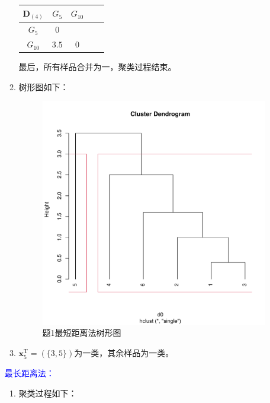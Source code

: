 \begin{enumerate}
\begin{enumerate}[label=(\arabic*)]
\begin{table}[H]
                \centering
                \begin{tabular}{|c|c|c|c|c|}
                    \hline
                    $\pmb{D}_{(4)}$ & $G_5$ & $G_{10}$ \\ \hline
                    $G_5$ & $0$ & \\ \hline
                    $G_{10}$ & $\textit{3.5}$ & $0$ \\ \hline
                \end{tabular}
            \end{table}
            最后，所有样品合并为一，聚类过程结束。
            \item 树形图如下：
            \begin{figure}[H]
                \centering
                \includegraphics[scale=0.5]{7.1最短距离法.pdf}
                \caption{题1最短距离法树形图}
            \end{figure}
            \item $\pmb{x}_5^{\mathrm{T}}=(\{3,5\})$为一类，其余样品为一类。
        \end{enumerate}
        {\kaishu \textcolor{blue}{最长距离法：}}
        \begin{enumerate}[label=(\arabic*)]
            \item 聚类过程如下：\\

\end{enumerate}
\end{enumerate}
